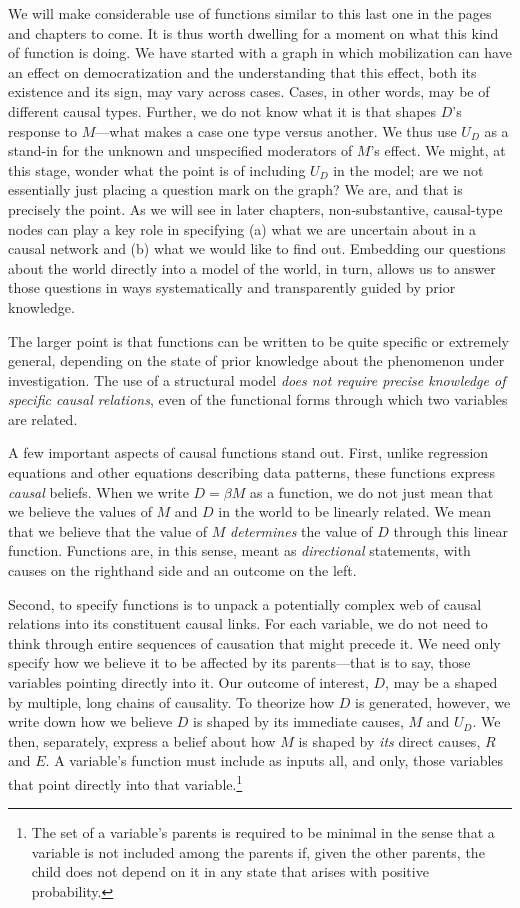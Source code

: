 \documentclass[12pt,]{book}
\let\rmarkdownfootnote\footnote%
\def\footnote{\protect\rmarkdownfootnote}
\begin{document}
We will make considerable use of functions similar to this last one in the pages and chapters to come. It is thus worth dwelling for a moment on what this kind of function is doing. We have started with a graph in which mobilization can have an effect on democratization and the understanding that this effect, both its existence and its sign, may vary across cases. Cases, in other words, may be of different causal types. Further, we do not know what it is that shapes \(D\)'s response to \(M\)---what makes a case one type versus another. We thus use \(U_D\) as a stand-in for the unknown and unspecified moderators of \(M\)'s effect. We might, at this stage, wonder what the point is of including \(U_D\) in the model; are we not essentially just placing a question mark on the graph? We are, and that is precisely the point. As we will see in later chapters, non-substantive, causal-type nodes can play a key role in specifying (a) what we are uncertain about in a causal network and (b) what we would like to find out. Embedding our questions about the world directly into a model of the world, in turn, allows us to answer those questions in ways systematically and transparently guided by prior knowledge.

The larger point is that functions can be written to be quite specific or extremely general, depending on the state of prior knowledge about the phenomenon under investigation. The use of a structural model \emph{does not require precise knowledge of specific causal relations}, even of the functional forms through which two variables are related.

A few important aspects of causal functions stand out. First, unlike regression equations and other equations describing data patterns, these functions express \emph{causal} beliefs. When we write \(D=\beta M\) as a function, we do not just mean that we believe the values of \(M\) and \(D\) in the world to be linearly related. We mean that we believe that the value of \(M\) \emph{determines} the value of \(D\) through this linear function. Functions are, in this sense, meant as \emph{directional} statements, with causes on the righthand side and an outcome on the left.

Second, to specify functions is to unpack a potentially complex web of causal relations into its constituent causal links. For each variable, we do not need to think through entire sequences of causation that might precede it. We need only specify how we believe it to be affected by its parents---that is to say, those variables pointing directly into it. Our outcome of interest, \(D\), may be a shaped by multiple, long chains of causality. To theorize how \(D\) is generated, however, we write down how we believe \(D\) is shaped by its immediate causes, \(M\) and \(U_D\). We then, separately, express a belief about how \(M\) is shaped by \emph{its} direct causes, \(R\) and \(E\). A variable's function must include as inputs all, and only, those variables that point directly into that variable.\footnote{The set of a variable's parents is required to be minimal in the sense that a variable is not included among the parents if, given the other parents, the child does not depend on it in any state that arises with positive probability.}
\end{document}
